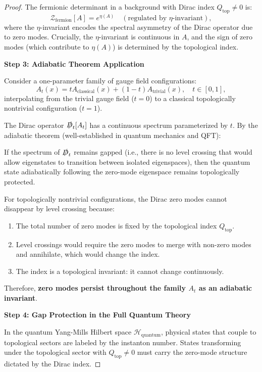 \begin{theorem}
\begin{proof}
The fermionic determinant in a background with Dirac index $Q_{\text{top}} \neq 0$ is:
\begin{equation}
\mathcal{Z}_{\text{fermion}}[A] = e^{\eta(A)} \quad (\text{regulated by } \eta\text{-invariant}),
\end{equation}
where the $\eta$-invariant encodes the spectral asymmetry of the Dirac operator due to zero modes. Crucially, the $\eta$-invariant is continuous in $A$, and the sign of zero modes (which contribute to $\eta(A)$) is determined by the topological index.

\textbf{Step 3: Adiabatic Theorem Application}

Consider a one-parameter family of gauge field configurations:
\begin{equation}
A_t(x) = t A_{\text{classical}}(x) + (1-t) A_{\text{trivial}}(x), \quad t \in [0,1],
\end{equation}
interpolating from the trivial gauge field ($t=0$) to a classical topologically nontrivial configuration ($t=1$).

The Dirac operator $\slashed{D}_t[A_t]$ has a continuous spectrum parameterized by $t$. By the adiabatic theorem (well-established in quantum mechanics and QFT):

If the spectrum of $\slashed{D}_t$ remains gapped (i.e., there is no level crossing that would allow eigenstates to transition between isolated eigenspaces), then the quantum state adiabatically following the zero-mode eigenspace remains topologically protected.

For topologically nontrivial configurations, the Dirac zero modes cannot disappear by level crossing because:
\begin{enumerate}
\item The total number of zero modes is fixed by the topological index $Q_{\text{top}}$.
\item Level crossings would require the zero modes to merge with non-zero modes and annihilate, which would change the index.
\item The index is a topological invariant: it cannot change continuously.
\end{enumerate}

Therefore, \textbf{zero modes persist throughout the family $A_t$ as an adiabatic invariant}.

\textbf{Step 4: Gap Protection in the Full Quantum Theory}

In the quantum Yang-Mills Hilbert space $\mathcal{H}_{\text{quantum}}$, physical states that couple to topological sectors are labeled by the instanton number. States transforming under the topological sector with $Q_{\text{top}} \neq 0$ must carry the zero-mode structure dictated by the Dirac index.


\end{proof}
\end{theorem}
